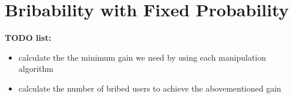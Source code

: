 
\section{Bribability with Fixed Probability}
\label{section:fixed_voters}

\noindent
\noindent
\textbf{TODO list:}
\begin{itemize}
\item calculate the the minimum gain we need by using each manipulation algorithm
\item calculate the number of bribed users to achieve the abovementioned gain
\end{itemize}